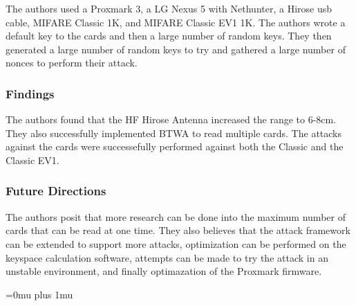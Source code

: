 \noindent
The authors used a Proxmark 3, a LG Nexus 5 with Nethunter, a Hirose usb cable, MIFARE Classic 1K, and MIFARE Classic EV1 1K.  The authors wrote a default key to the cards and then a large number of random keys.  They then generated a large number of random keys to try and gathered a large number of nonces to perform their attack.

\subsubsection{Findings}

\noindent
The authors found that the HF Hirose Antenna increased the range to 6-8cm.  They also successfully implemented BTWA to read multiple cards.  The attacks against the cards were successefully performed against both the Classic and the Classic EV1.

\subsubsection{Future Directions}

\noindent
The authors posit that more research can be done into the maximum number of cards that can be read at one time.  They also believes that the attack framework can be extended to support more attacks, optimization can be performed on the keyspace calculation software, attempts can be made to try the attack in an unstable environment, and finally optimazation of the Proxmark firmware.

\Urlmuskip=0mu plus 1mu\relax
\pagebreak